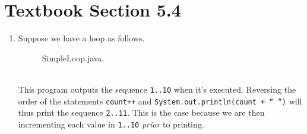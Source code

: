 \documentclass[leqno, 11pt]{article}
\begin{document}
\section*{Textbook Section 5.4}
\begin{enumerate}
  \item Suppose we have a loop as follows.
        \begin{figure}[h!]
          \centering
          
          \caption{SimpleLoop.java.}
          \label{fig:three}
        \end{figure}\\
        This program outputs the sequence \texttt{1..10} when it's executed. Reversing the order of the statements \texttt{count++} and \texttt{System.out.println(count + `` '')} will thus print the sequence \texttt{2..11}. This is the case because we are then incrementing each value in \texttt{1..10} \textit{prior} to printing. 
        

\end{enumerate}
\end{document}
